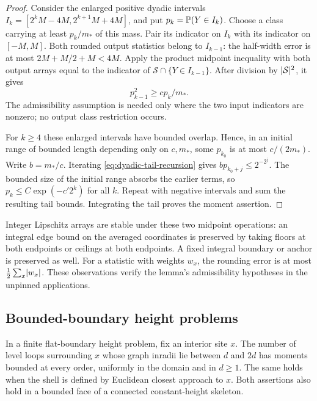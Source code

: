 \begin{proof}
Consider the enlarged positive dyadic intervals
$I_k=[2^kM-4M,2^{k+1}M+4M]$, and put $p_k=\mathbb P(Y\in I_k)$.
Choose a class carrying at least $p_k/m_*$ of this mass.  Pair its
indicator on $I_k$ with its indicator on $[-M,M]$.  Both rounded output
statistics belong to $I_{k-1}$: the half-width error is at most
$2M+M/2+M<4M$.  Apply the product midpoint inequality with both output
arrays equal to the indicator of $\mathcal S\cap\{Y\in I_{k-1}\}$.
After division by $\lvert\mathcal S\rvert^2$, it gives
\begin{equation}\label{eq:dyadic-tail-recursion}
 p_{k-1}^2\geq c p_k/m_*.
\end{equation}
The admissibility assumption is needed only where the two input
indicators are nonzero; no output class restriction occurs.

For $k\geq4$ these enlarged intervals have bounded overlap.  Hence, in
an initial range of bounded length depending only on $c,m_*$, some $p_{k_0}$
is at most $c/(2m_*)$.  Write $b=m_*/c$.  Iterating
\eqref{eq:dyadic-tail-recursion} gives
$b p_{k_0+j}\leq2^{-2^j}$.  The bounded size of the initial range absorbs
the earlier terms, so $p_k\leq C\exp(-c'2^k)$ for all $k$.  Repeat with
negative intervals and sum the resulting tail bounds.  Integrating the
tail proves the moment assertion.
\end{proof}

Integer Lipschitz arrays are stable under these two midpoint operations:
an integral edge bound on the averaged coordinates is preserved by taking
floors at both endpoints or ceilings at both endpoints.  A fixed integral
boundary or anchor is preserved as well.  For a statistic with weights
$w_x$, the rounding error is at most $\frac12\sum_x\lvert w_x\rvert$.  These
observations verify the lemma's admissibility hypotheses in the unpinned
applications.

\subsection{Bounded-boundary height problems}

\begin{lemma}\label{lem:loop-shells}
In a finite flat-boundary height problem, fix an interior site $x$.
The number of level loops surrounding $x$ whose graph inradii lie between
$d$ and $2d$ has moments bounded at every order, uniformly in the domain
and in $d\geq1$.  The same holds when the shell is defined by Euclidean
closest approach to $x$.  Both assertions also hold in a bounded face of
a connected constant-height skeleton.
\end{lemma}


